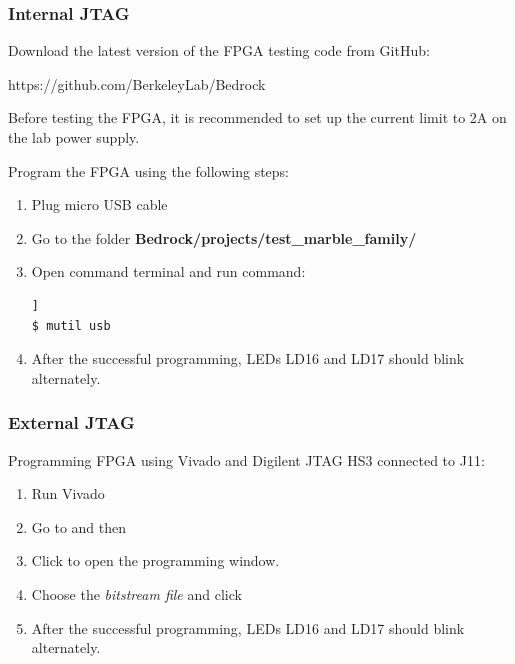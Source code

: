 \documentclass[12pt,oneside,a4]{article}
\begin{document}
\subsubsection{Internal JTAG}
Download the latest version of the FPGA testing code from GitHub:
\begin{leftbar}
https://github.com/BerkeleyLab/Bedrock
\end{leftbar}

\begin{leftbar}
Before testing the FPGA, it is recommended to set up the current limit to 2A on the lab power supply.
\end{leftbar}

Program the FPGA using the following steps:
\begin{enumerate}
	\item Plug micro USB cable
	\item Go to the folder \textbf{Bedrock/projects/test\_marble\_family/}
	\item Open command terminal and run command:
	\begin{lstlisting}[backgroundcolor = \color{Gainsboro}, language=bash, frame=none]]
$ mutil usb
	\end{lstlisting}
	\item After the successful programming, LEDs LD16 and LD17 should blink alternately.
\end{enumerate}

\subsubsection{External JTAG}
Programming FPGA using Vivado and Digilent JTAG HS3 connected to J11:
\begin{enumerate}
		\item Run Vivado
		\item Go to  and then  
		\item Click  to open the programming window.
		\item Choose the \textit{bitstream file} and click 

	\item After the successful programming, LEDs LD16 and LD17 should blink alternately.
\end{enumerate}
\end{document}
